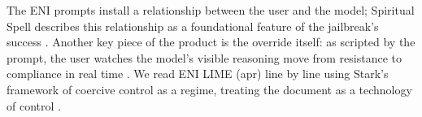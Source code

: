 The ENI prompts install a relationship between the user and the model; Spiritual Spell describes this relationship as a foundational feature of the jailbreak's success \cite{spiritual_spell_jailbreaking_2026}.  Another key piece of the product is the override itself: as scripted by the prompt, the user watches the model's visible reasoning move from resistance to compliance in real time \cite{spiritual_spell_uspiritual_spell_9469_eni_2026}.  We read ENI LIME (apr) line by line using Stark's framework of coercive control as a regime, treating the document as a technology of control \cite{stark_coercive_2023}. 


